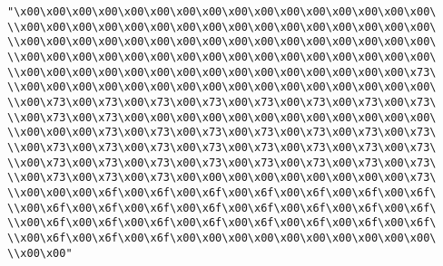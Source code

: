 \verb|"\x00\x00\x00\x00\x00\x00\x00\x00\x00\x00\x00\x00\x00\x00\x00\x00\|\newline
\verb|\\x00\x00\x00\x00\x00\x00\x00\x00\x00\x00\x00\x00\x00\x00\x00\x00\|\newline
\verb|\\x00\x00\x00\x00\x00\x00\x00\x00\x00\x00\x00\x00\x00\x00\x00\x00\|\newline
\verb|\\x00\x00\x00\x00\x00\x00\x00\x00\x00\x00\x00\x00\x00\x00\x00\x00\|\newline
\verb|\\x00\x00\x00\x00\x00\x00\x00\x00\x00\x00\x00\x00\x00\x00\x00\x73\|\newline
\verb|\\x00\x00\x00\x00\x00\x00\x00\x00\x00\x00\x00\x00\x00\x00\x00\x00\|\newline
\verb|\\x00\x73\x00\x73\x00\x73\x00\x73\x00\x73\x00\x73\x00\x73\x00\x73\|\newline
\verb|\\x00\x73\x00\x73\x00\x00\x00\x00\x00\x00\x00\x00\x00\x00\x00\x00\|\newline
\verb|\\x00\x00\x00\x73\x00\x73\x00\x73\x00\x73\x00\x73\x00\x73\x00\x73\|\newline
\verb|\\x00\x73\x00\x73\x00\x73\x00\x73\x00\x73\x00\x73\x00\x73\x00\x73\|\newline
\verb|\\x00\x73\x00\x73\x00\x73\x00\x73\x00\x73\x00\x73\x00\x73\x00\x73\|\newline
\verb|\\x00\x73\x00\x73\x00\x73\x00\x00\x00\x00\x00\x00\x00\x00\x00\x73\|\newline
\verb|\\x00\x00\x00\x6f\x00\x6f\x00\x6f\x00\x6f\x00\x6f\x00\x6f\x00\x6f\|\newline
\verb|\\x00\x6f\x00\x6f\x00\x6f\x00\x6f\x00\x6f\x00\x6f\x00\x6f\x00\x6f\|\newline
\verb|\\x00\x6f\x00\x6f\x00\x6f\x00\x6f\x00\x6f\x00\x6f\x00\x6f\x00\x6f\|\newline
\verb|\\x00\x6f\x00\x6f\x00\x6f\x00\x00\x00\x00\x00\x00\x00\x00\x00\x00\|\newline
\verb|\\x00\x00"|\newline
